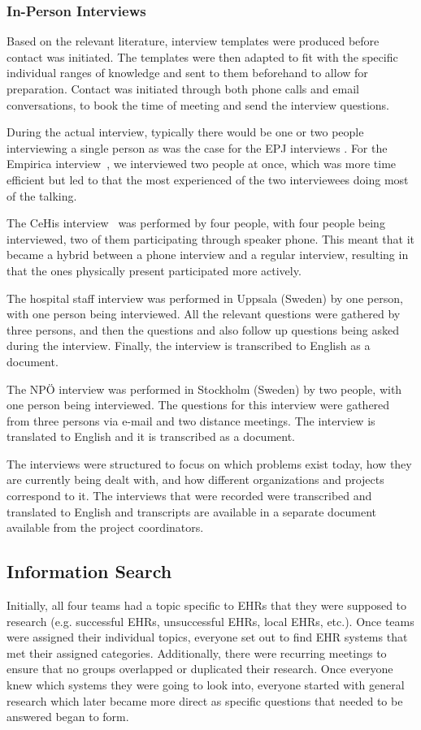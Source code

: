 \documentclass[14pt]{article}
\begin{document}
\subsubsection{In-Person Interviews}

Based on the relevant literature, interview templates were produced before contact was initiated. The templates were then adapted to fit with the specific individual ranges of knowledge and sent to them beforehand to allow for preparation. Contact was initiated through both phone calls and email conversations, to book the time of meeting and send the interview questions.

During the actual interview, typically there would be one or two people interviewing a single person as was the case for the EPJ interviews \cite{EPJ1} \cite{EPJ2}. For the Empirica interview~\cite{Empirica}, we interviewed two people at once, which was more time efficient but led to that the most experienced of the two interviewees doing most of the talking.

The CeHis interview~\cite{CeHis} was performed by four people, with four people being interviewed, two of them participating through speaker phone. This meant that it became a hybrid between a phone interview and a regular interview, resulting in that the ones physically present participated more actively.

The hospital staff interview \cite{FarzinYazdi} was performed in Uppsala (Sweden) by one person, with one person being interviewed. All the relevant questions were gathered by three persons, and then the questions and also follow up questions being asked during the interview. Finally, the interview is transcribed to English as a document. 

The NPÖ interview \cite{ViktorJernelov} was performed in Stockholm (Sweden) by two people, with one person being interviewed. The questions for this interview were gathered from three persons via e-mail and two distance meetings. The interview is translated to English and it is transcribed as a document.

The interviews were structured to focus on which problems exist today, how they are currently being dealt with, and how different organizations and projects correspond to it. The interviews that were recorded were transcribed and translated to English and transcripts are available in a separate document available from the project coordinators.

\subsection{Information Search}
Initially, all four teams had a topic specific to \glspl{EHR} that they were supposed to research (e.g. successful \glspl{EHR}, unsuccessful \glspl{EHR}, local \glspl{EHR}, etc.). Once teams were assigned their individual topics, everyone set out to find \gls{EHR} systems that met their assigned categories. Additionally, there were recurring meetings to ensure that no groups overlapped or duplicated their research. Once everyone knew which systems they were going to look into, everyone started with general research which later became more direct as specific questions that needed to be answered began to form.
\end{document}
